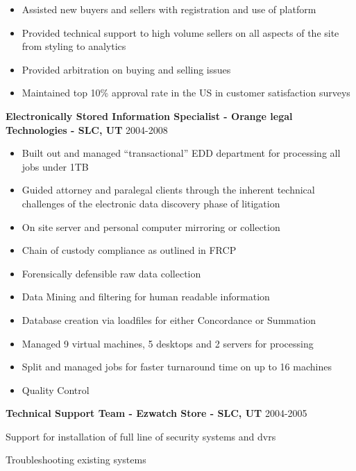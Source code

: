 \documentclass[line,margin]{res}
\begin{document}
\begin{resume}
   \begin{itemize} \itemsep -2pt
   \item Assisted new buyers and sellers with registration and use of platform
   \item Provided technical support to high volume sellers on all aspects of the site from styling to analytics
   \item Provided arbitration on buying and selling issues
   \item Maintained top 10\% approval rate in the US in customer satisfaction surveys
   \end{itemize}
 {\bf Electronically Stored Information Specialist - Orange legal Technologies - SLC, UT} \hfill 2004-2008\\
  \begin{itemize} \itemsep -2pt
  \item Built out and managed “transactional” EDD department for processing all jobs under 1TB
  \item Guided attorney and paralegal clients through the inherent technical challenges of the electronic data discovery phase of litigation
  \item On site server and personal computer mirroring or collection
  \item Chain of custody compliance as outlined in FRCP
  \item Forensically defensible raw data collection 
  \item Data Mining and filtering for human readable information
  \item Database creation via loadfiles for either Concordance or Summation
  \item Managed 9 virtual machines, 5 desktops and 2 servers for processing 
  \item Split and managed jobs for faster turnaround time on up to 16 machines
  \item Quality Control
  \end{itemize}
{\bf Technical Support Team - Ezwatch Store - SLC, UT} \hfill 2004-2005\\
  \item Support for installation of full line of security systems and dvrs
  \item Troubleshooting existing systems

\end{resume}
\end{document}
